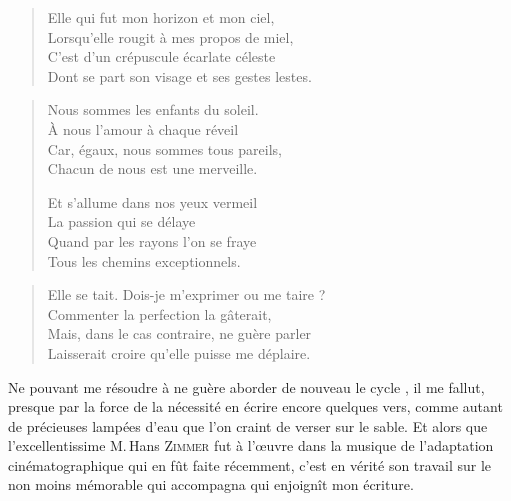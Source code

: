 \begin{verse}
Elle qui fut mon horizon et mon ciel,\\
Lorsqu’elle rougit à mes propos de miel,\\
C’est d’un crépuscule écarlate céleste\\
Dont se part son visage et ses gestes lestes.
\end{verse}

\begin{verse}
Nous sommes les enfants du soleil.\\
À nous l’amour à chaque réveil\\
Car, égaux, nous sommes tous pareils,\\
Chacun de nous est une merveille.

Et s’allume dans nos yeux vermeil\\
La passion qui se délaye\\
Quand par les rayons l’on se fraye\\
Tous les chemins exceptionnels.
\end{verse}

\begin{verse}
Elle se tait. Dois-je m’exprimer ou me taire ?\\
Commenter la perfection la gâterait,\\
Mais, dans le cas contraire, ne guère parler\\
Laisserait croire qu’elle puisse me déplaire.
\end{verse}

\begin{prose} 
Ne pouvant me résoudre à ne guère aborder de nouveau le cycle , il me fallut, presque par la force de la nécessité en écrire encore quelques vers, comme autant de précieuses lampées d’eau que l’on craint de verser sur le sable. Et alors que l’excellentissime M.\,Hans \textsc{Zimmer} fut à l’œuvre dans la musique de l’adaptation cinématographique qui en fût faite récemment, c’est en vérité son travail sur le non moins mémorable  qui accompagna  qui enjoignît mon écriture.
\end{prose}

